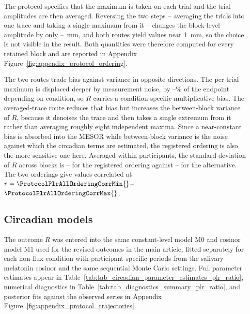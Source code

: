 \begin{appendixbox}
The protocol specifies that the maximum is taken on each trial and the trial amplitudes are then averaged. Reversing the two steps -- averaging the trials into one trace and taking a single maximum from it -- changes the block-level amplitude by only \ProtocolPlrAllOrderingBiasMmMin{}--\ProtocolPlrAllOrderingBiasMmMax{}~mm, and both routes yield values near 1~mm, so the choice is not visible in the result. Both quantities were therefore computed for every retained block and are reported in Appendix Figure~\ref{fig:appendix_protocol_ordering}.

The two routes trade bias against variance in opposite directions. The per-trial maximum is displaced deeper by measurement noise, by \ProtocolPlrAllOrderingBiasPctMin{}--\ProtocolPlrAllOrderingBiasPctMax{}\% of the endpoint depending on condition, so $R$ carries a condition-specific multiplicative bias. The averaged-trace route reduces that bias but increases the between-block variance of $R$, because it denoises the trace and then takes a single extremum from it rather than averaging roughly eight independent maxima. Since a near-constant bias is absorbed into the MESOR while between-block variance is the noise against which the circadian terms are estimated, the registered ordering is also the more sensitive one here. Averaged within participants, the standard deviation of $R$ across blocks is \ProtocolPlrAllWithinPpSdPertrialMin{}--\ProtocolPlrAllWithinPpSdPertrialMax{} for the registered ordering against \ProtocolPlrAllWithinPpSdAvgtraceMin{}--\ProtocolPlrAllWithinPpSdAvgtraceMax{} for the alternative. The two orderings give values correlated at $r = \ProtocolPlrAllOrderingCorrMin{}$--$\ProtocolPlrAllOrderingCorrMax{}$.

\subsection{Circadian models}

The outcome $R$ was entered into the same constant-level model M0 and cosinor model M1 used for the revised outcomes in the main article, fitted separately for each non-\acs{flux} condition with participant-specific periods from the salivary melatonin cosinor and the same sequential Monte Carlo settings. Full parameter estimates appear in Table~\ref{tab:tab_circadian_parameter_estimates_plr_ratio}, numerical diagnostics in Table~\ref{tab:tab_diagnostics_summary_plr_ratio}, and posterior fits against the observed series in Appendix Figure~\ref{fig:appendix_protocol_trajectories}.


\end{appendixbox}
